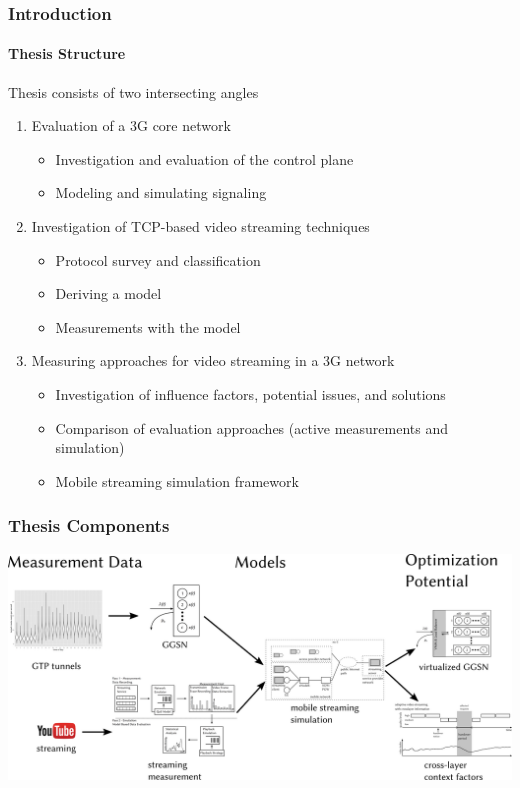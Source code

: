 \documentclass{beamer}
\begin{document}
\begin{frame}
	\frametitle{Introduction}
	\framesubtitle{Thesis Structure}

	Thesis consists of two intersecting angles
	\begin{enumerate}
		\item Evaluation of a 3G core network
			\begin{itemize}
				\item Investigation and evaluation of the control plane
				\item Modeling and simulating signaling
			\end{itemize}

		\item<2-> Investigation of TCP-based video streaming techniques
			\begin{itemize}[<2->]
				\item Protocol survey and classification
				\item Deriving a model
				\item Measurements with the model
			\end{itemize}

		\item<3-> Measuring approaches for video streaming in a 3G network 
			\begin{itemize}[<3->]
				\item Investigation of influence factors, potential issues, and solutions
				\item Comparison of evaluation approaches (active measurements and simulation)
				\item Mobile streaming simulation framework
			\end{itemize}
	\end{enumerate}


\end{frame}

\begin{frame}
	\frametitle{Thesis Components}

	\begin{center}
		\includegraphics[width=\textwidth]{extras/thesiscomponents.png}
	\end{center}

\end{frame}
\end{document}

